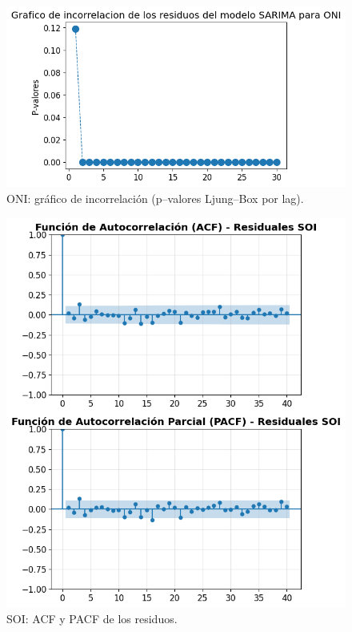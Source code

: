 \begin{figure}[H]\centering
\includegraphics[scale=.52]{Figures/inco_oni.png}
\caption{ONI: gráfico de incorrelación (p--valores Ljung--Box por lag).}
\label{fig:inco_oni}
\end{figure}


\begin{figure}[H]\centering
\includegraphics[scale=.52]{Figures/acp_pacf_res_soi.png}
\caption{SOI: ACF y PACF de los residuos.}
\label{fig:acf_pacf_res_soi}
\end{figure}

